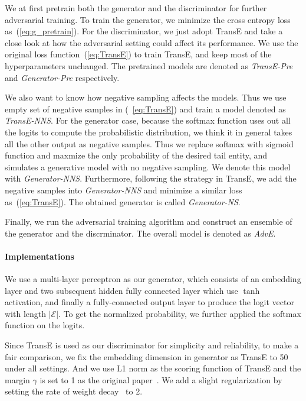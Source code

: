\documentclass[twocolumn,a4paper,10pt,preprint,3p]{elsarticle}
\begin{document}
We at first pretrain both the generator and the discriminator for further adversarial training. To train the generator, we minimize the cross entropy loss as~(\ref{eq:g_pretrain}). For the discriminator, we just adopt TransE and take a close look at how the adversarial setting could affect its performance. We use the original loss function~(\ref{eq:TransE}) to train TransE, and keep most of the hyperparameters unchanged. The pretrained models are denoted as \emph{TransE-Pre} and \emph{Generator-Pre} respectively.

We also want to know how negative sampling affects the models. Thus we use empty set of negative samples in (~\ref{eq:TransE}) and train a model denoted as \emph{TransE-NNS}. For the generator case, because the softmax function uses out all the logits to compute the probabilistic distribution, we think it in general takes all the other output as negative samples. Thus we replace softmax with sigmoid function and maxmize the only probability of the desired tail entity, and simulates a generative model with no negative sampling. We denote this model with \emph{Generator-NNS}. Furthermore, following the strategy in TransE, we add the negative samples into \emph{Generator-NNS} and  minimize a similar loss as~(\ref{eq:TransE}). The obtained generator is called \emph{Generator-NS}.

Finally, we run the adversarial training algorithm and construct an ensemble of the generator and the discrminator. The overall model is denoted as \emph{AdvE}.

\paragraph{Implementations} We use a multi-layer perceptron as our generator, which consists of an embedding layer and two subsequent hidden fully connected layer which use $\tanh$ activation, and finally a fully-connected output layer to produce the logit vector with length $\lvert\mathcal{E} \rvert$. To get the normalized probability, we further applied the softmax function on the logits.

Since TransE is used as our discriminator for simplicity and reliability, to make a fair comparison, we fix the embedding dimension in generator as TransE to 50 under all settings. And we use L1 norm as the scoring function of TransE and the margin $\gamma$ is set to 1 as the original paper~\cite{TransE2013}. We add a slight regularization by setting the rate of weight decay~\cite{weight_decay} to 2.
\end{document}
